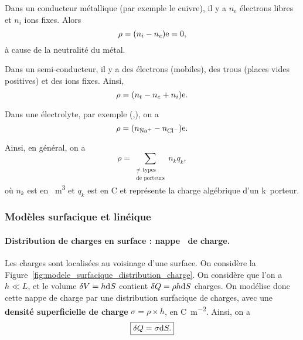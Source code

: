             \begin{example}
                Dans un conducteur métallique (par exemple le cuivre), il y a $n_e$ électrons libres et $n_i$ ions fixes. Alors 
                \begin{equation*}
                    \rho=(n_i-n_e)\mathrm{e}=0,
                \end{equation*}
                à cause de la neutralité du métal.
            \end{example}
            \begin{example}
                Dans un semi-conducteur, il y a des électrons (mobiles), des trous (places vides positives) et des ions fixes. Ainsi,
                \begin{equation*}
                    \rho=(n_t-n_e+n_i)\mathrm{e}.
                \end{equation*}
            \end{example}
            \begin{example}
                Dans une électrolyte, par exemple (,), on a 
                \begin{equation*}
                    \rho=(n_{\ce{Na+}}-n_{\ce{Cl-}})\rme.
                \end{equation*}
            \end{example}

            Ainsi, en général, on a
            \begin{equation*}
                \rho=\sum_{\substack{\neq\text{ types}\\\text{de porteurs}}}n_{k}q_{k},
            \end{equation*}
            où $n_k$ est en \si{\per\metre\cubed} et $q_k$ est en \si{\coulomb} et représente la charge algébrique d'un \og k\fg~porteur.

        \subsubsection{Modèles surfacique et linéique}

            \paragraph{Distribution de charges en surface : \og nappe\fg~ de charge.}

                Les charges sont localisées au voisinage d'une surface. On considère la Figure~\ref{fig:modele_surfacique_distribution_charge}. On considère que l'on a $h\ll L$, et le volume $\delta V=h\mathrm{d} S$ contient $\delta Q=\rho h\mathrm{d} S$ charges. On modélise donc cette nappe de charge par une distribution surfacique de charges, avec une \textbf{densité superficielle de charge} $\sigma=\rho\times h$, en \si{\coulomb\per\metre\squared}. Ainsi, on a 
                \begin{equation*}
                    \boxed{
                        \delta Q=\sigma\mathrm{d} S.
                    }
                \end{equation*}

